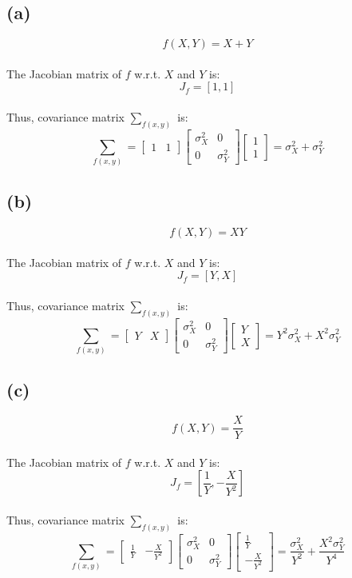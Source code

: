 \documentclass{article}
\begin{document}
\subsection*{(a)}
\[ f(X, Y) = X + Y \]
\\
The Jacobian matrix of $f$ w.r.t. $X$ and $Y$ is:
\[ J_f = [1, 1] \]
\\
Thus, covariance matrix $\sum_{f(x,y)}$ is:
\[ \sum_{f(x,y)} =   \begin{bmatrix} 1 & 1 \end{bmatrix} \begin{bmatrix} \sigma^2_X & 0 \\ 0 & \sigma^2_Y \end{bmatrix} \begin{bmatrix} 1 \\ 1 \end{bmatrix} = \sigma^2_X + \sigma^2_Y \]

\subsection*{(b)}
\[ f(X, Y) = XY \]
\\
The Jacobian matrix of $f$ w.r.t. $X$ and $Y$ is:
\[ J_f = [Y, X] \]
\\
Thus, covariance matrix $\sum_{f(x,y)}$ is:
\[ \sum_{f(x,y)} =   \begin{bmatrix} Y & X \end{bmatrix} \begin{bmatrix} \sigma^2_X & 0 \\ 0 & \sigma^2_Y \end{bmatrix} \begin{bmatrix} Y \\ X \end{bmatrix} = Y^2 \sigma^2_X + X^2 \sigma^2_Y \]

\subsection*{(c)}
\[ f(X, Y) = \frac{X}{Y} \]
\\
The Jacobian matrix of $f$ w.r.t. $X$ and $Y$ is:
\[ J_f = [\frac{1}{Y}, -\frac{X}{Y^2}] \]
\\
Thus, covariance matrix $\sum_{f(x,y)}$ is:
\[ \sum_{f(x,y)} = \begin{bmatrix} \frac{1}{Y} & -\frac{X}{Y^2} \end{bmatrix} \begin{bmatrix} \sigma^2_X & 0 \\ 0 & \sigma^2_Y \end{bmatrix} \begin{bmatrix} \frac{1}{Y} \\ -\frac{X}{Y^2} \end{bmatrix} = \frac{\sigma^2_X}{Y^2} + \frac{X^2 \sigma^2_Y}{Y^4} \]
\end{document}
